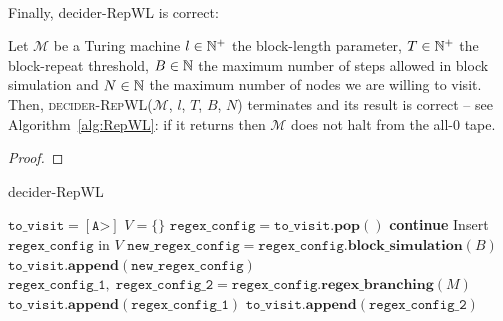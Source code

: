\ \\
Finally, {\sc decider-RepWL} is correct:

\begin{theorem}\label{th:repwl}
    Let $\mathcal{M}$ be a Turing machine $l\in \mathbb{N}^+$ the block-length parameter, $T \in \mathbb{N}^+$ the block-repeat threshold, $B \in \mathbb{N}$ the maximum number of steps allowed in block simulation and $N \in \mathbb{N}$ the maximum number of nodes we are willing to visit. Then, \textsc{decider-RepWL}($\mathcal{M}$, $l$, $T$, $B$, $N$) terminates and its result is correct -- see Algorithm~\ref{alg:RepWL}: if it returns \NONHALT then $\mathcal{M}$ does not halt from the all-$0$ tape.
\end{theorem}
\begin{proof}

\end{proof}


\begin{algorithm}
    \caption{{\sc decider-RepWL}}\label{alg:RepWL}

    \begin{algorithmic}[1]
        \State
        \State $\texttt{to\_visit} = [\texttt{A>}]$
        \State $V = \{\}$ 
        \State {}
        \State $\texttt{regex\_config} = \texttt{to\_visit}.\textbf{pop}()$
        \State {}
        \State \textbf{continue}
        \EndIf
        \State
        \State Insert $\texttt{regex\_config}$ in $V$
        \State {}
        \State $\texttt{new\_regex\_config} = \texttt{regex\_config}.\textbf{block\_simulation}(B)$
        \State \Return \UNKNOWN
        \EndIf
        \State $\texttt{to\_visit}.\textbf{append}(\texttt{new\_regex\_config})$
        \Else {}
        \State $\texttt{regex\_config\_1}, \; \texttt{regex\_config\_2} = \texttt{regex\_config}.\textbf{regex\_branching}(M)$
        \State $\texttt{to\_visit}.\textbf{append}(\texttt{regex\_config\_1})$
        \State $\texttt{to\_visit}.\textbf{append}(\texttt{regex\_config\_2})$
        \EndIf
        \EndWhile

        \State {}
        \State \Return{\NONHALT}\label{alg:RepWL:closed}
        \Else
        \State \Return{\UNKNOWN}
        \EndIf
    \end{algorithmic}
\end{algorithm}

